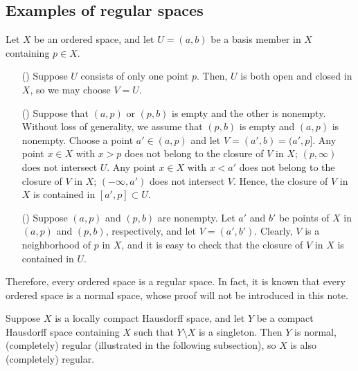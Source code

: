 \subsection{Examples of regular spaces}
\begin{exmp}
    Let $X$ be an ordered space, and let $U=(a, b)$ be a basis member in $X$ containing $p\in X$.
    \begin{enumerate}
        \item[(\romannumeral 1)]
        {
            Suppose $U$ consists of only one point $p$.
            Then, $U$ is both open and closed in $X$, so we may choose $V=U$.
        }
        \item[(\romannumeral 2)]
        {
            Suppose that $(a, p)$ or $(p, b)$ is empty and the other is nonempty.
            Without loss of generality, we assume that $(p, b)$ is empty and $(a, p)$ is nonempty.
            Choose a point $a'\in(a, p)$ and let $V=(a', b)=(a', p]$.
            Any point $x\in X$ with $x>p$ does not belong to the closure of $V$ in $X$; $(p, \infty)$ does not intersect $U$.
            Any point $x\in X$ with $x<a'$ does not belong to the closure of $V$ in $X$; $(-\infty, a')$ does not intersect $V$.
            Hence, the closure of $V$ in $X$ is contained in $[a', p]\subset U$.
        }
        \item[(\romannumeral 3)]
        {
            Suppose $(a, p)$ and $(p, b)$ are nonempty.
            Let $a'$ and $b'$ be points of $X$ in $(a, p)$ and $(p, b)$, respectively, and let $V=(a', b')$.
            Clearly, $V$ is a neighborhood of $p$ in $X$, and it is easy to check that the closure of $V$ in $X$ is contained in $U$.
        }
    \end{enumerate}
    Therefore, every ordered space is a regular space.
    In fact, it is known that every ordered space is a normal space, whose proof will not be introduced in this note.
\end{exmp}

\begin{exmp}
    Suppose $X$ is a locally compact Hausdorff space, and let $Y$ be a compact Hausdorff space containing $X$ such that $Y\setminus X$ is a singleton.
    Then $Y$ is normal, (completely) regular (illustrated in the following subsection), so $X$ is also (completely) regular.
\end{exmp}

